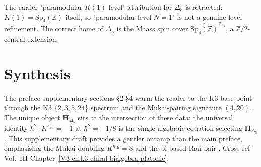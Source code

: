 \begin{remark}
\label{rem:pref-non-paramodular}
The earlier "paramodular $K(1)$ level" attribution for $\Delta_5$
is retracted: $K(1) = \mathrm{Sp}_4(\mathbb{Z})$ itself, so
"paramodular level $N = 1$" is not a genuine level refinement. The
correct home of $\Delta_5$ is the Maass spin cover
$\widehat{\mathrm{Sp}_4(\mathbb{Z})}^{v_{\Delta_5}}$, a
$\mathbb{Z}/2$-central extension.
\end{remark}

\section{Synthesis}
\label{sec:pref24-supplement}

\begin{remark}
\label{rem:pref24-1}
The preface supplementary sections \S2-\S4 warm the reader to the
K3 base point through the K3 $\{2,3,5,24\}$ spectrum and the
Mukai-pairing signature $(4, 20)$. The unique object
$\mathbf H_{\Delta_5}$ sits at the intersection of these data; the
universal identity $\hbar^2 \cdot K^{\kappa_{\mathrm{ch}}} = -1$ at
$\hbar^2 = -1/8$ is the single algebraic equation selecting
$\mathbf H_{\Delta_5}$. This supplementary draft provides a gentler
onramp than the main preface, emphasising the Mukai doubling
$K^{\kappa_{\mathrm{ch}}} = 8$ and the bi-based Ran pair
\cite{Mukai1987,GritsenkoNikulin1998}. Cross-ref Vol.~III
Chapter~\ref{V3-ch:k3-chiral-bialgebra-platonic}.
\end{remark}
